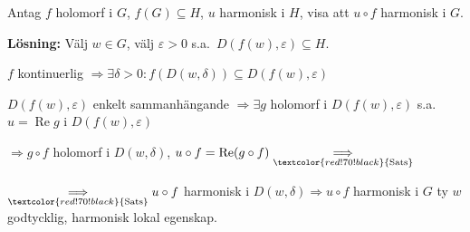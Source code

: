  \quad Antag $f$ holomorf i $G$, $f(G) \subseteq H$, $u$ harmonisk i $H$, visa att $u \circ f$ harmonisk i $G$.

\textbf{Lösning:} Välj $w \in G$, välj $\varepsilon > 0$ s.a.\ $D(f(w), \varepsilon) \subseteq H$.

$f$ kontinuerlig $\Rightarrow \exists \delta > 0 : f(D(w, \delta)) \subseteq D(f(w), \varepsilon)$

$D(f(w), \varepsilon)$ enkelt sammanhängande $\Rightarrow \exists g$ holomorf i $D(f(w), \varepsilon)$ s.a.\ $u = \operatorname{Re} g$ i $D(f(w), \varepsilon)$

$\Rightarrow g \circ f$ holomorf i $D(w, \delta)$, $u \circ f = \operatorname{Re}(g \circ f) \underset{\textcolor{red!70!black}{\text{Sats}}}{\Longrightarrow}$

$\underset{\textcolor{red!70!black}{\text{Sats}}}{\Longrightarrow} u \circ f$ harmonisk i $D(w, \delta) \Rightarrow u \circ f$ harmonisk i $G$ ty $w$ godtycklig, harmonisk lokal egenskap.
